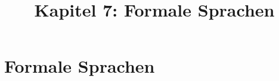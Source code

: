\documentclass[18pt]{beamer}
\title[Formale Sprachen]{Kapitel 7: Formale Sprachen}
\begin{document}

\begin{frame}
 \titlepage
\end{frame}

\def\showSolutions{1}					 %

\section{Formale Sprachen}
\title[Formale Sprachen]{}

\end{document}
